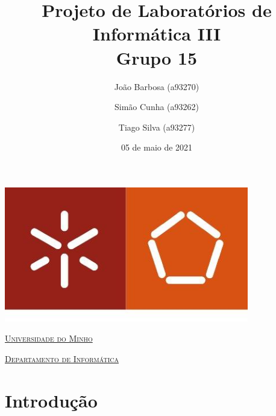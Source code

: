 \documentclass[a4paper]{article}
\begin{document}
\title{Projeto de Laboratórios de Informática III\\Grupo 15}
\author{João Barbosa (a93270) \and Simão Cunha (a93262) \and Tiago Silva (a93277)} 
\date{05 de maio de 2021}

\begin{titlepage}

  \thispagestyle{empty} 
  \begin{center}
  \begin{minipage}{0.75\linewidth}
      \centering
      \includegraphics[width=0.8\textwidth]{eng.jpeg}\par\vspace{3cm}
      \vspace{1.5cm}
      \href{https://www.uminho.pt/PT}{\scshape\LARGE Universidade do Minho}\cite{uminho} \par
      \vspace{1cm}
      \href{https://www.di.uminho.pt/}{\scshape\Large Departamento de Informática}\cite{dinformatica} \par
      \vspace{1.5cm}

  \maketitle

  \end{minipage}
  \end{center}
  
  \end{titlepage}
  

 

\pagebreak
{}

\tableofcontents


\pagebreak

\section{Introdução}
\label{sec:intro}
\end{document}
